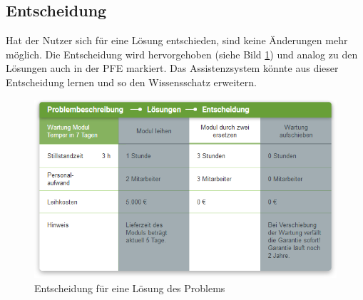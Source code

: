 \subsection{Entscheidung}
Hat der Nutzer sich für eine Lösung entschieden, sind keine Änderungen mehr möglich. Die Entscheidung wird hervorgehoben (siehe Bild \ref{pic:pD-Entscheidung}) und analog zu den Lösungen auch in der PFE markiert. Das Assistenzsystem könnte aus dieser Entscheidung lernen und so den Wissensschatz erweitern. 
\begin{figure}[htbp]
\centering
\includegraphics[scale=0.7]{DA_files/Bilder/Konzept/Skizze-Entscheidung.png}
\caption{Entscheidung für eine Lösung des Problems}
\label{pic:pD-Entscheidung}
\end{figure}


